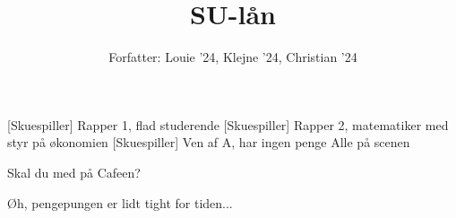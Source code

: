 \documentclass[a4paper,11pt]{article}
\title{SU-lån}
\author{Forfatter: Louie '24, Klejne '24, Christian '24}
\begin{document}
\maketitle

\begin{roles}
[Skuespiller] Rapper 1, flad studerende
[Skuespiller] Rapper 2, matematiker med styr på økonomien
[Skuespiller] Ven af A, har ingen penge
 Alle på scenen
\end{roles}

\begin{sketch}

 Skal du med på Cafeen?

 Øh, pengepungen er lidt tight for tiden...

\end{sketch}
\end{document}
